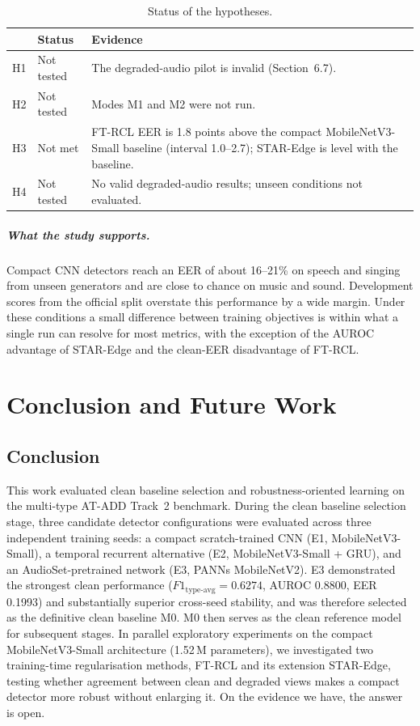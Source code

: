 \documentclass[12pt,a4paper]{report}
\begin{document}
\begin{table}[htbp]
\centering
\caption{Status of the hypotheses.}
\label{tab:hypotheses}
\small

\begin{tabular}{@{}lp{3.6cm}p{8cm}@{}}
\toprule
 & Status & Evidence \\
\midrule
H1 & Not tested & The degraded-audio pilot is invalid (Section~6.7). \\
H2 & Not tested & Modes M1 and M2 were not run. \\
H3 & Not met & FT-RCL EER is 1.8 points above the compact MobileNetV3-Small baseline (interval 1.0--2.7); STAR-Edge is level with the baseline. \\
H4 & Not tested & No valid degraded-audio results; unseen conditions not evaluated. \\
\bottomrule
\end{tabular}

\end{table}

\paragraph{What the study supports.} Compact CNN detectors reach an EER of about 16--21\% on speech and singing from unseen generators and are close to chance on music and sound. Development scores from the official split overstate this performance by a wide margin. Under these conditions a small difference between training objectives is within what a single run can resolve for most metrics, with the exception of the AUROC advantage of STAR-Edge and the clean-EER disadvantage of FT-RCL.

\chapter{Conclusion and Future Work}
\label{ch:conclusion}

\section{Conclusion}

This work evaluated clean baseline selection and robustness-oriented learning on the multi-type AT-ADD Track~2 benchmark. During the clean baseline selection stage, three candidate detector configurations were evaluated across three independent training seeds: a compact scratch-trained CNN (E1, MobileNetV3-Small), a temporal recurrent alternative (E2, MobileNetV3-Small + GRU), and an AudioSet-pretrained network (E3, PANNs MobileNetV2). E3 demonstrated the strongest clean performance ($F1_{\mathrm{type\text{-}avg}}=0.6274$, AUROC 0.8800, EER 0.1993) and substantially superior cross-seed stability, and was therefore selected as the definitive clean baseline M0. M0 then serves as the clean reference model for subsequent stages. In parallel exploratory experiments on the compact MobileNetV3-Small architecture (1.52\,M parameters), we investigated two training-time regularisation methods, FT-RCL and its extension STAR-Edge, testing whether agreement between clean and degraded views makes a compact detector more robust without enlarging it. On the evidence we have, the answer is open.
\end{document}

